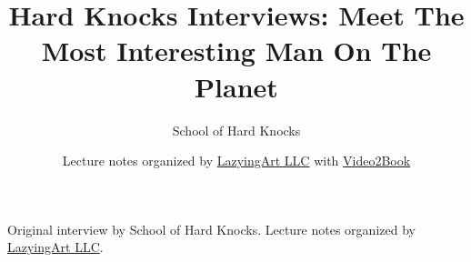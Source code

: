 \documentclass[11pt,oneside]{book}
\begin{document}
\frontmatter
\title{Hard Knocks Interviews: Meet The Most Interesting Man On The Planet}
\author{School of Hard Knocks}
\date{Lecture notes organized by \href{https://lazying.art}{LazyingArt LLC} with \href{https://github.com/lachlanchen/Video2Book}{Video2Book}}
\maketitle
\begin{center}
\small Original interview by School of Hard Knocks. Lecture notes organized by \href{https://lazying.art}{LazyingArt LLC}.
\end{center}
\clearpage
\mainmatter

\end{document}

